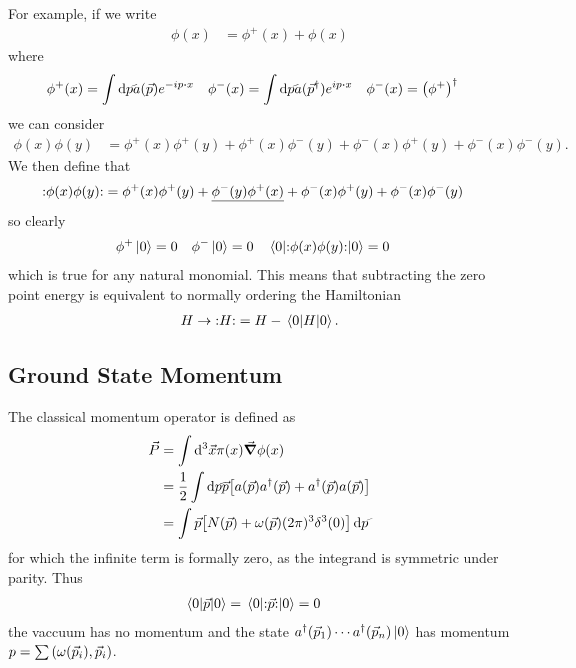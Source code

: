 \documentclass[notes.tex]{subfiles}
\begin{document}
For example, if we write 
\begin{align*}
    \phi(x) &= \phi^+(x) + \phi(x)
\end{align*}
where
\begin{align*}
    \phi^+(x) &= \int \dds{p} a(\vec{p})e^{-ip\vdot{x}}&
    \phi^-(x) &= \int \dds{p} a(\vec{p}^\dagger)e^{ip\vdot{x}}&
    \phi^-(x) &= \qty(\phi^+)^\dagger
\end{align*}
we can consider
\begin{align*}
    \phi(x)\phi(y) &= \phi^+(x)\phi^+(y) + \phi^+(x)\phi^-(y) + \phi^-(x)\phi^+(y) + \phi^-(x)\phi^-(y).
\end{align*}
We then define that
\begin{align*}
    \mathbf{:}\phi(x)\phi(y)\mathbf{:} &= \phi^+(x)\phi^+(y) + \underline{\phi^-(y)\phi^+(x)} + \phi^-(x)\phi^+(y) + \phi^-(x)\phi^-(y)
\end{align*}
so clearly
\begin{align*}
    \phi^+\ket{0} &= 0 & \phi^-\ket{0} &= 0 & \mel{0}{\mathbf{:}\phi(x)\phi(y)\mathbf{:}}{0} &= 0
\end{align*} 
which is true for any natural monomial.
This means that subtracting the zero point energy is equivalent to normally ordering the Hamiltonian
\begin{align*}
    H \to \mathbf{:}H\mathbf{:} = H - \mel{0}{H}{0}.
\end{align*}

\subsection{Ground State Momentum}
The classical momentum operator is defined as
\begin{align*}
    \vec{P} &= \int \dd[3]\vec{x} \pi(x)\grad{\phi}(x)\\
    &= \half\int\dds{p} \vec{p} \qty[a(\vec{p})a^\dagger(\vec{p}) + a^\dagger(\vec{p}) a(\vec{p})]\\
    &= \int \vec{p}\qty[N(\vec{p}) + \omega(\vec{p})(2\pi)^3 \delta^3(0)] \,\dds{p} 
\end{align*}
for which the infinite term is formally zero, as the integrand is symmetric under parity. 
Thus
\begin{align*}
    \mel{0}{\vec{p}}{0} &= \mel{0}{\mathbf{:}\vec{p}\mathbf{:}}{0} = 0
\end{align*}
\ie{}the vaccuum has no momentum and the state $a^\dagger(\vec{p}_1)\cdots a^\dagger(\vec{p}_n)\ket{0}$ has momentum $p = \sum\qty(\omega(\vec{p}_i), \vec{p}_i)$.
\end{document}
